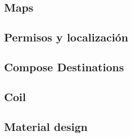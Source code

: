 \subsection{Maps}

\subsection{Permisos y localización}

\subsection{Compose Destinations}

\hypertarget{subsec:coil}{}
\subsection{Coil} 

\subsection{Material design}
\label{subsec:material_design}
